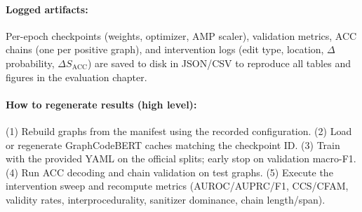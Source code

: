 \documentclass{buthesis}
\begin{document}
\begin{appendices}
\paragraph{Logged artifacts:}
Per-epoch checkpoints (weights, optimizer, AMP scaler), validation metrics,
ACC chains (one per positive graph), and intervention logs (edit type, location,
$\Delta$ probability, $\Delta S_{\text{ACC}}$) are saved to disk in JSON/CSV to reproduce
all tables and figures in the evaluation chapter.

\paragraph{How to regenerate results (high level):}
(1) Rebuild graphs from the manifest using the recorded configuration.
(2) Load or regenerate GraphCodeBERT caches matching the checkpoint ID.
(3) Train with the provided YAML on the official splits; early stop on validation
macro-F1. (4) Run ACC decoding and chain validation on test graphs. (5) Execute
the intervention sweep and recompute metrics (AUROC/AUPRC/F1, CCS/CFAM,
validity rates, interprocedurality, sanitizer dominance, chain length/span).


\end{appendices}
\end{document}

